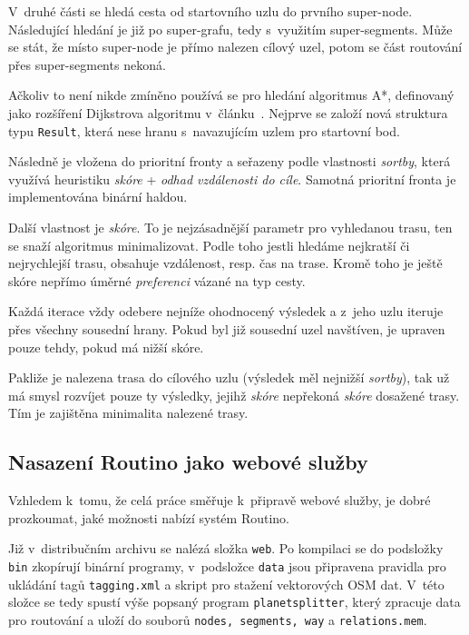 \documentclass[thesis=B,czech]{FITthesis}[2012/06/26]
\begin{document}
V~druhé části se hledá cesta od startovního uzlu do prvního super-node. Následující hledání je již po super-grafu, tedy s~využitím super-segments.
Může se stát, že místo super-node je přímo nalezen cílový uzel, potom se část routování přes super-segments nekoná.

Ačkoliv to není nikde zmíněno používá se pro hledání algoritmus A*, definovaný jako rozšíření Dijkstrova algoritmu v~článku~\cite{astar}. Nejprve se založí nová struktura typu \verb|Result|, která nese hranu s~navazujícím uzlem pro startovní bod.

Následně je vložena do prioritní fronty a seřazeny podle vlastnosti \emph{sortby}, která využívá heuristiku \emph{skóre} + \emph{odhad vzdálenosti do cíle}. Samotná prioritní fronta je implementována binární haldou.

Další vlastnost je \emph{skóre}. To je nejzásadnější parametr pro vyhledanou trasu, ten se snaží algoritmus minimalizovat. Podle toho jestli hledáme nejkratší či nejrychlejší trasu, obsahuje vzdálenost, resp. čas na trase. Kromě toho je ještě skóre nepřímo úměrné \emph{preferenci} vázané na typ cesty.

Každá iterace vždy odebere nejníže ohodnocený výsledek a z~jeho uzlu iteruje přes všechny sousední hrany. Pokud byl již sousední uzel navštíven, je upraven pouze tehdy, pokud má nižší skóre.

Pakliže je nalezena trasa do cílového uzlu (výsledek měl nejnižší \emph{sortby}), tak už má smysl rozvíjet pouze ty výsledky, jejihž \emph{skóre} nepřekoná \emph{skóre} dosažené trasy. Tím je zajištěna minimalita nalezené trasy.

\subsection{Nasazení Routino jako webové služby}
Vzhledem k~tomu, že celá práce směřuje k~připravě webové služby, je dobré prozkoumat, jaké možnosti nabízí systém Routino. 

Již v~distribučním archivu se nalézá složka \verb|web|. Po kompilaci se do podsložky \verb|bin| zkopírují binární programy, v~podsložce \verb|data| jsou připravena pravidla pro ukládání tagů \verb|tagging.xml| a skript pro stažení vektorových OSM dat. V~této složce se tedy spustí výše popsaný program \verb|planetsplitter|, který zpracuje data pro routování a uloží do souborů \verb|nodes, segments, way| a \verb|relations.mem|. 
\end{document}

